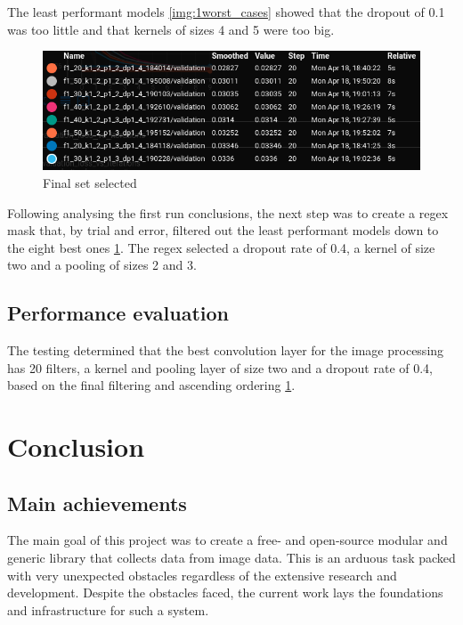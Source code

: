 \documentclass[
    11pt,
    oneside
]{report}
\begin{document}
The least performant models \ref{img:1worst_cases} showed that the dropout of 0.1 was too little and that kernels of sizes 4 and 5 were too big.


\begin{figure}[H]
    \includegraphics[keepaspectratio, width=\columnwidth]{Screenshot_2022-04-20_23-36-21.png}
    \caption{Final set selected}
    \label{img:final_set}
\end{figure}

Following analysing the first run conclusions, the next step was to create a regex mask that, by trial and error, filtered out the least performant models down to the eight best ones \ref{img:final_set}. The regex selected a dropout rate of 0.4, a kernel of size two and a pooling of sizes 2 and 3.




\section{Performance evaluation}

The testing determined that the best convolution layer for the image processing has 20 filters, a kernel and pooling layer of size two and a dropout rate of 0.4, based on the final filtering and ascending ordering \ref{img:final_set}.




\chapter{Conclusion}



\section{Main achievements}

The main goal of this project was to create a free- and open-source modular and generic library that collects data from image data. This is an arduous task packed with very unexpected obstacles regardless of the extensive research and development. Despite the obstacles faced, the current work lays the foundations and infrastructure for such a system.
\end{document}

